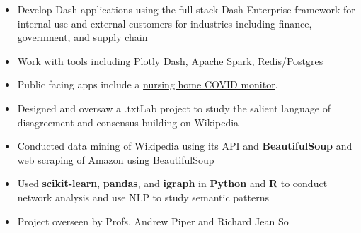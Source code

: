 \documentclass[10pt,ragged2e]{altacv}
\begin{document}
\tagline{}

\begin{fullwidth}
\makecvheader
\end{fullwidth}



\begin{itemize}
\item Develop Dash applications using the full-stack Dash Enterprise framework for internal use and external customers for industries including finance, government, and supply chain
\item Work with tools including Plotly Dash, Apache Spark, Redis/Postgres
\item Public facing apps include a {\href{https://tylertech.plotly.com/}{nursing home COVID monitor}}.

\end{itemize}

\divider

\begin{itemize}
\item Designed and oversaw a .txtLab project to study the salient language of disagreement and consensus building on Wikipedia
\item Conducted data mining of Wikipedia using its API and \textbf{BeautifulSoup} and web scraping of Amazon using BeautifulSoup
\item Used \textbf{scikit-learn}, \textbf{pandas}, and \textbf{igraph} in \textbf{Python} and \textbf{R} to conduct network analysis and use NLP to study semantic patterns
\item Project overseen by Profs. Andrew Piper and Richard Jean So
\end{itemize}
\end{document}
